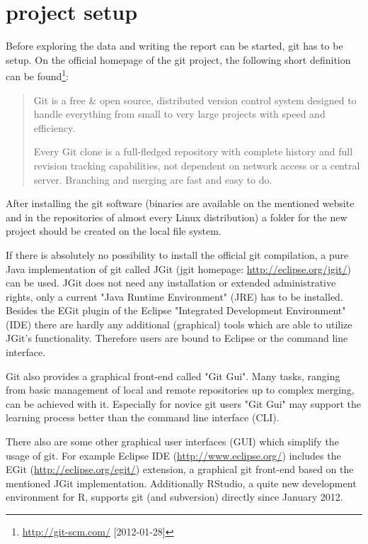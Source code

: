 \documentclass{ifacconf}
\begin{document}
\section{project setup}

Before exploring the data and writing the report can be started, git has to be setup.
On the official homepage of the git project, the following short definition 
can be found\footnote{\url{http://git-scm.com/} [2012-01-28]}:

\begin{quotation}
Git is a free \& open source, distributed version control 
system designed to handle everything from small to very large projects with speed and efficiency.

Every Git clone is a full-fledged repository with complete 
history and full revision tracking capabilities, not 
dependent on network access or a central server. Branching and merging are fast and easy to do.
\end{quotation}

After installing the git software (binaries are available on the mentioned website and in 
the repositories of almost every Linux distribution) a folder for the new project should be 
created on the local file system. 

If there is absolutely no possibility to install
the official git compilation, a pure Java implementation of git called JGit (jgit homepage: 
\url{http://eclipse.org/jgit/}) can be used. JGit does not need any installation or
extended administrative rights, only a current "Java Runtime Environment" (JRE) has
to be installed. Besides the EGit plugin of the Eclipse "Integrated Development 
Environment" (IDE) there are hardly any additional (graphical) tools which are able
to utilize JGit's functionality. Therefore users are bound to Eclipse or the 
command line interface.

Git also provides a graphical front-end called "Git Gui". Many tasks, ranging from
basic management of local and remote repositories up to complex merging, can be
achieved with it. Especially for novice git users "Git Gui" may support the learning 
process better than the command line interface (CLI).

There also are some other graphical user interfaces (GUI) which
simplify the usage of git. For example Eclipse IDE 
(\url{http://www.eclipse.org/}) includes the EGit
(\url{http://eclipse.org/egit/}) extension, a graphical git front-end based on
the mentioned JGit implementation. Additionally RStudio, a quite new development 
environment for R, supports git (and subversion) directly since January 2012.
\end{document}
